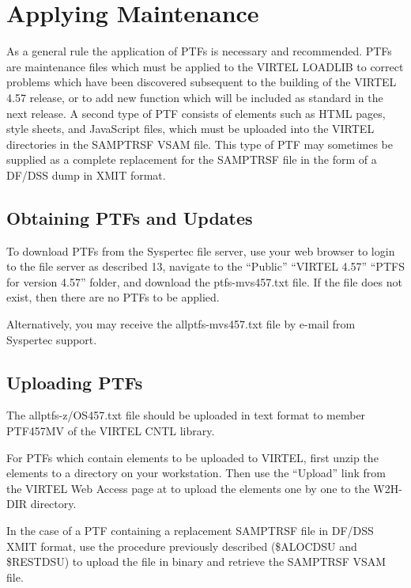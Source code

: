 \documentclass[letterpaper,10pt,english]{sphinxmanual}
\begin{document}

\section{Applying Maintenance}
\label{\detokenize{Installation_Guide:index-5}}\label{\detokenize{Installation_Guide:applying-maintenance}}
As a general rule the application of PTFs is necessary and recommended. PTFs are maintenance files which must be applied to the VIRTEL LOADLIB to correct problems which have been discovered subsequent to the building of the VIRTEL 4.57 release, or to add new function which will be included as standard in the next release. A second type of PTF consists of elements such as HTML pages, style sheets, and JavaScript files, which must be uploaded into the VIRTEL directories in the SAMPTRSF VSAM file. This type of PTF may sometimes be supplied as a complete replacement for the SAMPTRSF file in the form of a DF/DSS dump in XMIT format.


\subsection{Obtaining PTFs and Updates}
\label{\detokenize{Installation_Guide:obtaining-ptfs-and-updates}}
To download PTFs from the Syspertec file server, use your web browser to login to the file server as described 13, navigate to the “Public” \textendash{} “VIRTEL 4.57” \textendash{} “PTFS for version 4.57” folder, and download the ptfs-mvs457.txt file. If the file does not exist, then there are no PTFs to be applied.

Alternatively, you may receive the allptfs-mvs457.txt file by e-mail from Syspertec support.


\subsection{Uploading PTFs}
\label{\detokenize{Installation_Guide:uploading-ptfs}}
The allptfs-z/OS457.txt file should be uploaded in text format to member PTF457MV of the VIRTEL CNTL library.

For PTFs which contain elements to be uploaded to VIRTEL, first unzip the elements to a directory on your workstation. Then use the “Upload” link from the VIRTEL Web Access page at  to upload the elements one by one to the W2H-DIR directory.

In the case of a PTF containing a replacement SAMPTRSF file in DF/DSS XMIT format, use the procedure previously described (\$ALOCDSU and \$RESTDSU) to upload the file in binary and retrieve the SAMPTRSF VSAM file.
\end{document}
